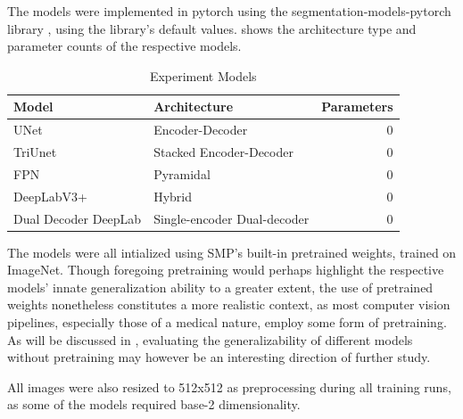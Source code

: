 The models were implemented in pytorch using the segmentation-models-pytorch library \cite{smp}, using the library's default values.  shows the architecture type and parameter counts of the respective models. 
  \begin{table}[h]
            \centering
            \begin{tabularx}{\linewidth}{lXr}
            \toprule
                 Model & Architecture & Parameters  \\
            \midrule
                 UNet \cite{unet} & Encoder-Decoder & 0\\ 
                 TriUnet \cite{divergentnets} & Stacked Encoder-Decoder & 0\\
                 FPN \cite{fpn} & Pyramidal & 0\\ 
                 DeepLabV3+ \cite{deeplab} & Hybrid & 0\\ 
                 Dual Decoder DeepLab & Single-encoder Dual-decoder & 0\\
            \bottomrule
            \end{tabularx}
            \caption{Experiment Models}
            \label{tab:baselines}
        \end{table}
The models were all intialized using SMP's built-in pretrained weights, trained on ImageNet. Though foregoing pretraining would perhaps highlight the respective models' innate generalization ability to a greater extent, the use of pretrained weights nonetheless constitutes a more realistic context, as most computer vision pipelines, especially those of a medical nature, employ some form of pretraining. As will be discussed in , evaluating the generalizability of different models without pretraining may however be an interesting direction of further study. 

All images were also resized to 512x512 as preprocessing during all training runs, as some of the models required base-2 dimensionality. 

